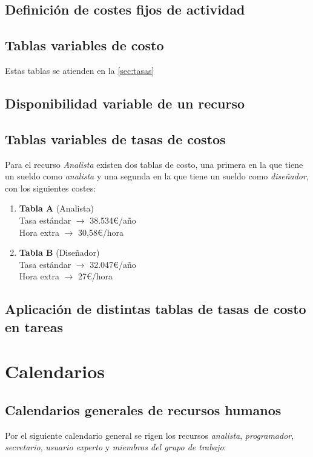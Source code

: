 \documentclass[11pt,a4paper,spanish,twoside]{book}
\begin{document}
\section{Definición de costes fijos de actividad}

\section{Tablas variables de costo}
Estas tablas se atienden en la \autoref{sec:tasas}

\section{Disponibilidad variable de un recurso}

\section{Tablas variables de tasas de costos} \label{sec:tasas}
Para el recurso \emph{Analista} existen dos tablas de costo, una primera en
la que tiene un sueldo como \emph{analista} y una segunda en la que tiene un
sueldo como \emph{diseñador}, con los siguientes costes:

\begin{enumerate}
\item \textbf{Tabla A} (Analista)
  \\Tasa estándar $\to$ 38.534\euro/año
  \\Hora extra $\to$ 30,58\euro/hora
\item \textbf{Tabla B} (Diseñador) 
  \\Tasa estándar $\to$ 32.047\euro/año
  \\Hora extra $\to$ 27\euro/hora
\end{enumerate}

\section{Aplicación de distintas tablas de tasas de costo en tareas}

\chapter{Calendarios}
\section{Calendarios generales de recursos humanos}
Por el siguiente calendario general se rigen los recursos \emph{analista},
\emph{programador}, \emph{secretario}, \emph{usuario experto} y
\emph{miembros del grupo de trabajo}:
\end{document}
